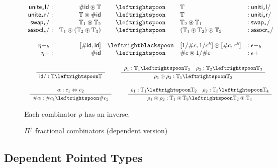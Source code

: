 \documentclass[a4paper,USenglish]{lipics-v2016-utf8x}
\newcommand{\hash}{\#}
\newcommand{\isotwo}{\Leftrightarrow}
\newcommand{\order}[1]{\hash #1}
\newcommand{\iorder}[1]{1/\hash #1}
\newcommand{\Rule}[4]{
\makebox{{\rm #1}
$\displaystyle
\frac{\begin{array}{l}#2\\\end{array}}
{\begin{array}{l}#3\\\end{array}}$
 #4}}
\newcommand{\jdg}[3]{{#1} #3}
\newcommand{\unitetl}{\mathsf{{unite_{\star}l}}}
\newcommand{\unititl}{\mathsf{{uniti_{\star}l}}}
\newcommand{\unitetr}{\mathsf{{unite_{\star}r}}}
\newcommand{\unititr}{\mathsf{{uniti_{\star}r}}}
\newcommand{\swapt}{\mathsf{{swap_{\star}}}}
\newcommand{\assoclt}{\mathsf{{assocl_{\star}}}}
\newcommand{\assocrt}{\mathsf{{assocr_{\star}}}}
\newcommand{\idiso}{\mathsf{{id}}}
\begin{document}
\begin{figure}[t]
\[\begin{array}{rrcll}
\unitetl/ :&  \order{\idiso} \circledast \mathbb{T} & \leftrightspoon & \mathbb{T} &: \unititl/ \\
\unitetr/ :&  \mathbb{T} \circledast \order{\idiso} & \leftrightspoon & \mathbb{T} &: \unititr/ \\
\swapt/ :&  \mathbb{T}_1 \circledast \mathbb{T}_2 & \leftrightspoon & \mathbb{T}_2 \circledast \mathbb{T}_1 &: \swapt/ \\
\assoclt/ :&  \mathbb{T}_1 \circledast (\mathbb{T}_2 \circledast \mathbb{T}_3) & \leftrightspoon & (\mathbb{T}_1 \circledast \mathbb{T}_2) \circledast \mathbb{T}_3
  &: \assocrt/ \\
\\
\eta-_k :& [\order{\idiso},\idiso] & \leftrightblackspoon &
  [\iorder{c},1/c^k] \circledast [\order{c},c^k] &: \epsilon-_k \\
\eta+ :& \order{\idiso} & \leftrightspoon & \order{c} \circledast \iorder{c} &: \epsilon+ \\
\end{array}\]

\[\begin{array}{c}
\Rule{}
{}
{\jdg{}{}{\idiso/ : \mathbb{T} \leftrightspoon \mathbb{T}}}
{}
\qquad
\Rule{}
{\jdg{}{}{\rho_1 : \mathbb{T}_1 \leftrightspoon \mathbb{T}_2} \quad \rho_2 : \mathbb{T}_2 \leftrightspoon \mathbb{T}_3}
{\jdg{}{}{\rho_1 \circledcirc \rho_2 : \mathbb{T}_1 \leftrightspoon \mathbb{T}_3}}
{}
\\
\\
\Rule{}
{\jdg{}{}{\alpha : c_1 \isotwo c_2}}
{\jdg{}{}{\order{\alpha} : \order{c_1}  \leftrightspoon \order{c_2}}}
{}
\qquad
\Rule{}
{\jdg{}{}{\rho_1 : \mathbb{T}_1 \leftrightspoon \mathbb{T}_2} \quad \rho_2 : \mathbb{T}_3 \leftrightspoon \mathbb{T}_4}
{\jdg{}{}{\rho_1 \circledast \rho_2 : \mathbb{T}_1 \circledast \mathbb{T}_3 \leftrightspoon \mathbb{T}_2 \circledast \mathbb{T}_4}}
{}
\end{array}\]

Each combinator $\rho$ has an inverse.
\caption{$\Pi^/$ fractional combinators (dependent version)}
\label{pifracd:comb}
\end{figure}

\subsection{Dependent Pointed Types}
\end{document}
